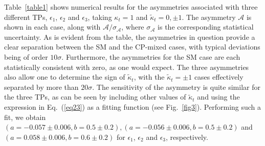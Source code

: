 \documentclass[aps,preprint,tightenlines,floatfix,superscriptaddress,nofootinbib,showpacs]{revtex4-1}
\def\kp{\kappa_t}
\def\kpt{\tilde{\kappa}_t}
\begin{document}
Table~\ref{table1} shows numerical results for the
asymmetries associated with three different TPs,
$\epsilon_1$, $\epsilon_2$ and $\epsilon_3$, taking
$\kp=1$ and $\kpt=0,\pm 1$.  The asymmetry $\mathcal{A}$
is shown in each case, along with $\mathcal{A}/\sigma_{\mathcal{A}}$, where
$\sigma_{\mathcal{A}}$ is the corresponding
statistical uncertainty.  As is
evident from the table, the asymmetries in question provide
a clear separation between the SM and the 
$\mathrm{CP}$-mixed cases, with typical deviations being of
order $10\sigma$.  Furthermore, the asymmetries
for the SM case are each statistically consistent with zero,
as one would expect.
The three asymmetries also allow one to
determine the sign of $\kpt$,
with the $\kpt = \pm 1$ cases effectively separated by more than $20\sigma$.
The sensitivity of
the asymmetry is quite similar for the three TPs, as can be seen by
including other values of $\kpt$ and using the expression in
Eq.~(\ref{eq23}) as a fitting function (see Fig.~\ref{fig3}).
Performing such a fit, 
we obtain $(a=-0.057\pm 0.006, b=0.5\pm 0.2),
(a=-0.056\pm 0.006, b=0.5 \pm 0.2)$ and $(a=0.058\pm 0.006, b=0.6 \pm
0.2)$ for $\epsilon_1$, $\epsilon_2$ and $\epsilon_3$,
respectively.
\end{document}
